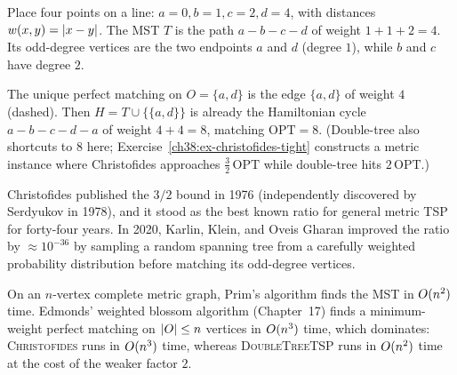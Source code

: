 \begin{labbox}
Place four points on a line: $a=0, b=1, c=2, d=4$, with distances $w(x,y)=\lvert x-y\rvert$. The MST $T$ is
the path $a\!-\!b\!-\!c\!-\!d$ of weight $1+1+2=4$. Its odd-degree vertices are the two endpoints $a$
and $d$ (degree $1$), while $b$ and $c$ have degree $2$.

\begin{center}
\end{center}

The unique perfect matching on $O=\{a,d\}$ is the edge $\{a,d\}$ of weight $4$ (dashed). Then
$H = T\cup\{\{a,d\}\}$ is already the Hamiltonian cycle $a\!-\!b\!-\!c\!-\!d\!-\!a$ of weight $4+4=8$,
matching $\mathrm{OPT}=8$. (Double-tree also shortcuts to $8$ here; Exercise~\ref{ch38:ex-christofides-tight}
constructs a metric instance where Christofides approaches $\tfrac32\,\mathrm{OPT}$ while double-tree hits $2\,\mathrm{OPT}$.)
\end{labbox}

\begin{marginnotebox}
Christofides published the $3/2$ bound in 1976 (independently discovered by Serdyukov in 1978), and it
stood as the best known ratio for general metric TSP for forty-four years. In 2020, Karlin, Klein, and
Oveis Gharan improved the ratio by $\approx 10^{-36}$ by sampling a random spanning tree from a
carefully weighted probability distribution before matching its odd-degree vertices.
\end{marginnotebox}

\begin{complexitybox}
On an $n$-vertex complete metric graph, Prim's algorithm finds the MST in $O(n^2)$ time. Edmonds'
weighted blossom algorithm (Chapter~17) finds a minimum-weight perfect matching on $\lvert O\rvert\le n$
vertices in $O(n^3)$ time, which dominates: \textsc{Christofides} runs in $O(n^3)$ time, whereas
\textsc{DoubleTreeTSP} runs in $O(n^2)$ time at the cost of the weaker factor $2$.
\end{complexitybox}

